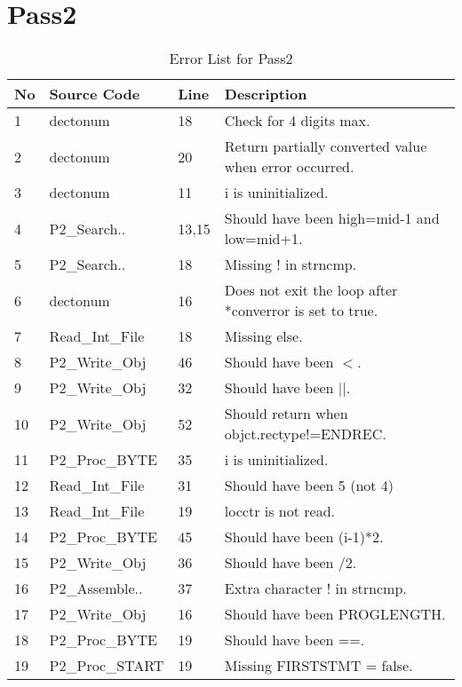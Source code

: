\section {Pass2}

\begin{table}[hb]
\begin{center}
\begin{tabular}{|l|l|l|l|}
\hline
No & Source Code & Line & Description \\
\hline
1 & dectonum & 18 & Check for 4 digits max.\\
2 & dectonum & 20 & Return partially converted value when error occurred. \\ 
3 & dectonum & 11 & i is uninitialized. \\ 
4 & P2\_Search..  &13,15 & Should have been high=mid-1 and low=mid+1.\\
5 & P2\_Search..  & 18 & Missing ! in strncmp.\\
6 & dectonum & 16 & Does not exit the loop after *converror is set to true.\\
7 & Read\_Int\_File  & 18 & Missing else. \\ 
8 & P2\_Write\_Obj  & 46 & Should have been $<$. \\
9 & P2\_Write\_Obj &32 & Should have been $||$. \\
10 &P2\_Write\_Obj &52  & Should return when objct.rectype!=ENDREC.\\
11 & P2\_Proc\_BYTE &35 & i is uninitialized. \\ 
12 & Read\_Int\_File  &31  & Should have been 5 (not 4) \\
13 & Read\_Int\_File & 19 & locctr is not read.\\
14 & P2\_Proc\_BYTE & 45 & Should have been (i-1)*2.\\ 
15 & P2\_Write\_Obj &36  & Should have been /2.\\
16 & P2\_Assemble..& 37 & Extra character ! in strncmp.\\
17 & P2\_Write\_Obj & 16 & Should have been PROGLENGTH.\\ 
18 & P2\_Proc\_BYTE & 19 & Should have been ==.\\ 
19 & P2\_Proc\_START & 19  & Missing FIRSTSTMT = false.\\
\hline
\end{tabular}
\caption{Error List for Pass2}
\end{center}
\end{table}
